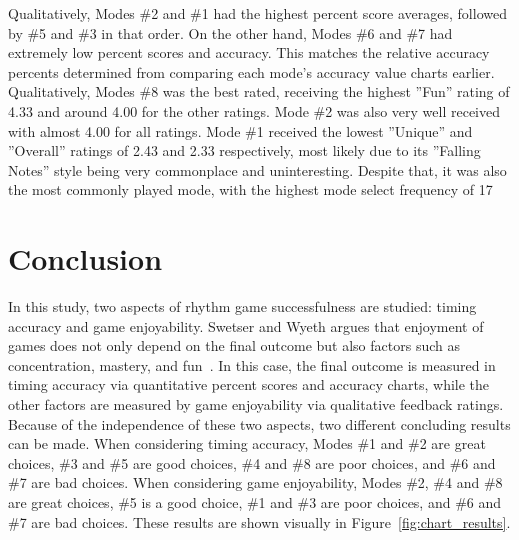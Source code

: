 \documentclass{sig-alternate}
\begin{document}
Qualitatively, Modes \#2 and \#1 had the highest percent score averages, followed by \#5 and \#3 in that order. On the other hand, Modes \#6 and \#7 had extremely low percent scores and accuracy. This matches the relative accuracy percents determined from comparing each mode's accuracy value charts earlier.\\

Qualitatively, Modes \#8 was the best rated, receiving the highest ''Fun'' rating of 4.33 and around 4.00 for the other ratings. Mode \#2 was also very well received with almost 4.00 for all ratings. Mode \#1 received the lowest ''Unique'' and ''Overall'' ratings of 2.43 and 2.33 respectively, most likely due to its ''Falling Notes'' style being very commonplace and uninteresting. Despite that, it was also the most commonly played mode, with the highest mode select frequency of 17%

\section{Conclusion}
\label{sec:conclusion}

In this study, two aspects of rhythm game successfulness are studied: timing accuracy and game enjoyability. Swetser and Wyeth argues that enjoyment of games does not only depend on the final outcome but also factors such as concentration, mastery, and fun~\cite{gameflow}. In this case, the final outcome is measured in timing accuracy via quantitative percent scores and accuracy charts, while the other factors are measured by game enjoyability via qualitative feedback ratings. \\

Because of the independence of these two aspects, two different concluding results can be made. When considering timing accuracy, Modes \#1 and \#2 are great choices, \#3 and \#5 are good choices, \#4 and \#8 are poor choices, and \#6 and \#7 are bad choices. When considering game enjoyability, Modes \#2, \#4 and \#8 are great choices, \#5 is a good choice, \#1 and \#3 are poor choices, and \#6 and \#7 are bad choices. These results are shown visually in Figure~\ref{fig:chart_results}.
\end{document}
